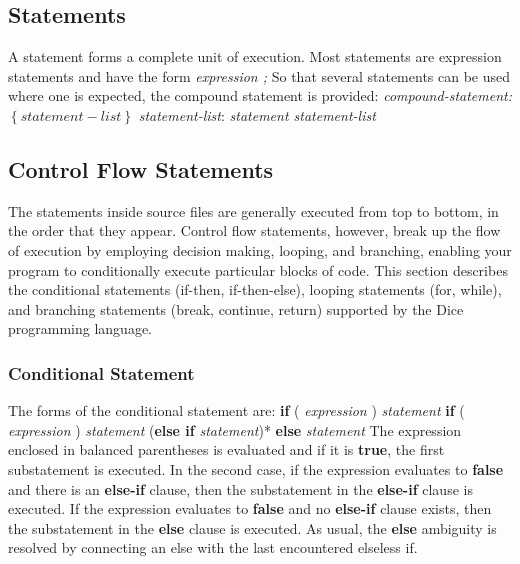 \begin{homeworkProblem}
	\section{Statements}
	A statement forms a complete unit of execution. Most statements are expression statements and have the form \newline
	\textit{expression ;}
	\newline
	\newline
	So that several statements can be used where one is expected, the compound statement is provided:
	\newline
	\textit{compound-statement:}\newline
	\textit{ $\left\{ statement-list \right\}$ }
	\newline
	\newline
	\textit{statement-list}:\newline
	\textit{statement statement-list}
	
	\subsection{Control Flow Statements}
	The statements inside source files are generally executed from top to bottom, in the order that they appear. Control flow statements, however, break up the flow of execution by employing decision making, looping, and branching, enabling your program to conditionally execute particular blocks of code. This section describes the conditional statements (if-then, if-then-else), looping statements (for, while), and branching statements (break, continue, return) supported by the Dice programming language.
	
	\subsubsection{Conditional Statement}
	The forms of the conditional statement are:\newline
	\textbf{if} ( \textit{expression} ) \textit{statement}
	\newline
	\textbf{if} ( \textit{expression} ) \textit{statement} (\textbf{else if} \textit{statement})* \textbf{else} \textit{statement}
	\newline
	\newline
	The expression enclosed in balanced parentheses is evaluated and if it is \textbf{true}, the first substatement is executed. In the second case, if the expression evaluates to \textbf{false} and there is an \textbf{else-if} clause, then the substatement in the \textbf{else-if} clause is executed. If the expression evaluates to \textbf{false} and no \textbf{else-if} clause exists, then the substatement in the \textbf{else} clause is executed. As usual, the \textbf{else} ambiguity is resolved by connecting an else with the last encountered elseless if.
	

\end{homeworkProblem}
